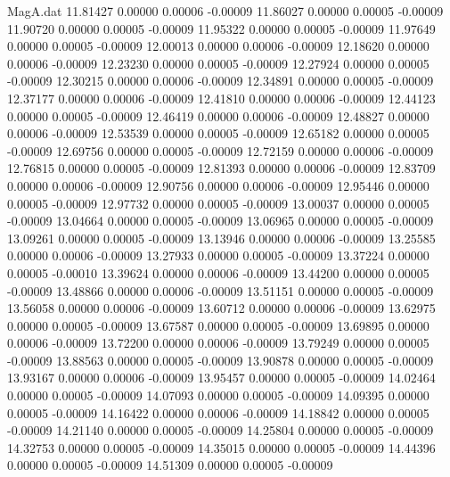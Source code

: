 \begin{filecontents}{MagA.dat}
  11.81427    0.00000    0.00006   -0.00009
  11.86027    0.00000    0.00005   -0.00009
  11.90720    0.00000    0.00005   -0.00009
  11.95322    0.00000    0.00005   -0.00009
  11.97649    0.00000    0.00005   -0.00009
  12.00013    0.00000    0.00006   -0.00009
  12.18620    0.00000    0.00006   -0.00009
  12.23230    0.00000    0.00005   -0.00009
  12.27924    0.00000    0.00005   -0.00009
  12.30215    0.00000    0.00006   -0.00009
  12.34891    0.00000    0.00005   -0.00009
  12.37177    0.00000    0.00006   -0.00009
  12.41810    0.00000    0.00006   -0.00009
  12.44123    0.00000    0.00005   -0.00009
  12.46419    0.00000    0.00006   -0.00009
  12.48827    0.00000    0.00006   -0.00009
  12.53539    0.00000    0.00005   -0.00009
  12.65182    0.00000    0.00005   -0.00009
  12.69756    0.00000    0.00005   -0.00009
  12.72159    0.00000    0.00006   -0.00009
  12.76815    0.00000    0.00005   -0.00009
  12.81393    0.00000    0.00006   -0.00009
  12.83709    0.00000    0.00006   -0.00009
  12.90756    0.00000    0.00006   -0.00009
  12.95446    0.00000    0.00005   -0.00009
  12.97732    0.00000    0.00005   -0.00009
  13.00037    0.00000    0.00005   -0.00009
  13.04664    0.00000    0.00005   -0.00009
  13.06965    0.00000    0.00005   -0.00009
  13.09261    0.00000    0.00005   -0.00009
  13.13946    0.00000    0.00006   -0.00009
  13.25585    0.00000    0.00006   -0.00009
  13.27933    0.00000    0.00005   -0.00009
  13.37224    0.00000    0.00005   -0.00010
  13.39624    0.00000    0.00006   -0.00009
  13.44200    0.00000    0.00005   -0.00009
  13.48866    0.00000    0.00006   -0.00009
  13.51151    0.00000    0.00005   -0.00009
  13.56058    0.00000    0.00006   -0.00009
  13.60712    0.00000    0.00006   -0.00009
  13.62975    0.00000    0.00005   -0.00009
  13.67587    0.00000    0.00005   -0.00009
  13.69895    0.00000    0.00006   -0.00009
  13.72200    0.00000    0.00006   -0.00009
  13.79249    0.00000    0.00005   -0.00009
  13.88563    0.00000    0.00005   -0.00009
  13.90878    0.00000    0.00005   -0.00009
  13.93167    0.00000    0.00006   -0.00009
  13.95457    0.00000    0.00005   -0.00009
  14.02464    0.00000    0.00005   -0.00009
  14.07093    0.00000    0.00005   -0.00009
  14.09395    0.00000    0.00005   -0.00009
  14.16422    0.00000    0.00006   -0.00009
  14.18842    0.00000    0.00005   -0.00009
  14.21140    0.00000    0.00005   -0.00009
  14.25804    0.00000    0.00005   -0.00009
  14.32753    0.00000    0.00005   -0.00009
  14.35015    0.00000    0.00005   -0.00009
  14.44396    0.00000    0.00005   -0.00009
  14.51309    0.00000    0.00005   -0.00009

\end{filecontents}
